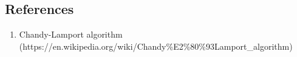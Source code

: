 \subsection{References}
\begin{enumerate}
    \item Chandy-Lamport algorithm (https://en.wikipedia.org/wiki/Chandy\%E2\%80\%93Lamport\_algorithm)
\end{enumerate}